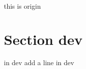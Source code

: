 \documentclass{article}
\begin{document}
    this is origin

    \section{Section dev}
    in dev
    add a line in dev
\end{document}

